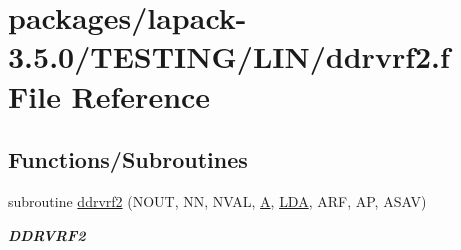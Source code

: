 \hypertarget{ddrvrf2_8f}{}\section{packages/lapack-\/3.5.0/\+T\+E\+S\+T\+I\+N\+G/\+L\+I\+N/ddrvrf2.f File Reference}
\label{ddrvrf2_8f}
\subsection*{Functions/\+Subroutines}
\begin{DoxyCompactItemize}
\item 
subroutine \hyperlink{group__double__lin_gadfec0f472fd2ce54edf26dfa27fee25b}{ddrvrf2} (N\+O\+U\+T, N\+N, N\+V\+A\+L, \hyperlink{classA}{A}, \hyperlink{example__user_8c_ae946da542ce0db94dced19b2ecefd1aa}{L\+D\+A}, A\+R\+F, A\+P, A\+S\+A\+V)
\begin{DoxyCompactList}\small\item\em {\bfseries D\+D\+R\+V\+R\+F2} \end{DoxyCompactList}\end{DoxyCompactItemize}

